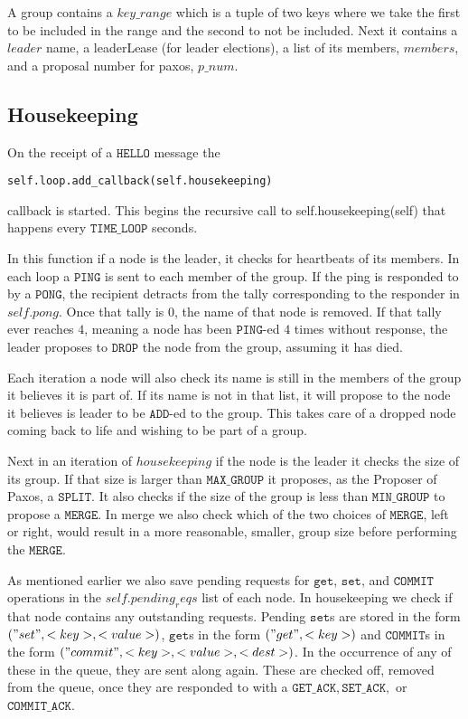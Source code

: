 \documentclass{amsart}
\theoremstyle{definition}
\theoremstyle{remark}
\numberwithin{equation}{section}
\begin{document}
A group contains a $key\_range$ which is a tuple of two keys where we take the first to be included in the range and the second to not be included. Next it contains a $leader$ name, a leaderLease (for leader elections), a list of its members, $members$, and a proposal number for paxos, $p\_num$.
\subsection{Housekeeping}
On the receipt of a $\mathtt{HELLO}$ message the
\begin{lstlisting}
self.loop.add_callback(self.housekeeping)   
\end{lstlisting}
callback is started. This begins the recursive call to self.housekeeping(self) that happens every $\mathtt{TIME\_LOOP}$ seconds. 

In this function if a node is the leader, it checks for heartbeats of its members. In each loop a $\mathtt{PING}$ is sent to each member of the group. If the ping is responded to by a $\mathtt{PONG}$, the recipient detracts from the tally corresponding to the responder in $self.pong$. Once that tally is $0$, the name of that node is removed. If that tally ever reaches $4$, meaning a node has been $\mathtt{PING}$-ed $4$ times without response, the leader proposes to $\mathtt{DROP}$ the node from the group, assuming it has died.

Each iteration a node will also check its name is still in the members of the group it believes it is part of. If its name is not in that list, it will propose to the node it believes is leader to be $\mathtt{ADD}$-ed to the group. This takes care of a dropped node coming back to life and wishing to be part of a group.

Next in an iteration of $housekeeping$ if the node is the leader it checks the size of its group. If that size is larger than $\mathtt{MAX\_GROUP}$ it proposes, as the Proposer of Paxos, a $\mathtt{SPLIT}$. It also checks if the size of the group is less than $\mathtt{MIN\_GROUP}$ to propose a $\mathtt{MERGE}$. In merge we also check which of the two choices of $\mathtt{MERGE}$, left or right, would result in a more reasonable, smaller, group size before performing the $\mathtt{MERGE}$.

As mentioned earlier we also save pending requests for $\mathtt{get}$, $\mathtt{set}$, and $\mathtt{COMMIT}$ operations in the $self.pending_reqs$ list of each node. In housekeeping we check if that node contains any outstanding requests. Pending $\mathtt{set}$s are stored in the form $("set", <key>, <value>)$, $\mathtt{get}$s in the form $("get", <key>)$ and $\mathtt{COMMIT}$s in the form $("commit", <key>, <value>, <dest>)$. In the occurrence of any of these in the queue, they are sent along again. These are checked off, removed from the queue, once they are responded to with a $\mathtt{GET\_ACK}, \mathtt{SET\_ACK},$ or $\mathtt{COMMIT\_ACK}$.
\end{document}
